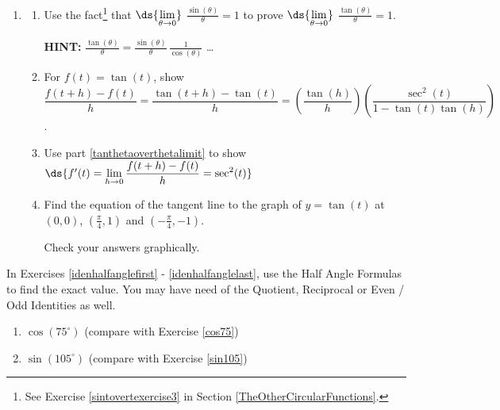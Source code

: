 \documentclass{ximera}
\begin{document}
\begin{enumerate}
\setcounter{enumi}{\value{HW}}

\item\label{derivativetangent}   \begin{enumerate}  \item\label{tanthetaoverthetalimit}  Use the fact\footnote{See Exercise \ref{sintovertexercise3} in Section \ref{TheOtherCircularFunctions}.} that $\ds{\lim_{\theta \rightarrow 0}}$ $\frac{\sin(\theta)}{\theta} = 1$  to prove $\ds{\lim_{\theta \rightarrow 0}}$ $\frac{\tan(\theta)}{\theta} = 1$.

\smallskip

\textbf{HINT:}  $\frac{\tan(\theta)}{\theta} = \frac{\sin(\theta)}{\theta} \, \frac{1}{\cos(\theta)}$ \ldots

\smallskip

 \item For $f(t) = \tan(t)$, show $\dfrac{f(t+h) - f(t)}{h} = \dfrac{\tan(t + h) - \tan(t)}{h} = \left( \dfrac{\tan(h)}{h} \right) \left(\dfrac{\sec^{2}(t)}{1 - \tan(t)\tan(h)} \right)$.

\smallskip

\item Use part \ref{tanthetaoverthetalimit} to show $\ds{f'(t) = \lim_{h \rightarrow 0} \dfrac{f(t+h) - f(t)}{h} = \sec^{2}(t)}$


\item  Find the equation of the tangent line to the graph of $y = \tan(t)$ at $(0,0)$, $\left(\frac{\pi}{4}, 1 \right)$ and $\left(-\frac{\pi}{4}, -1\right)$.  

\smallskip

Check your answers graphically.

\end{enumerate}

\setcounter{HW}{\value{enumi}}
\end{enumerate}


In Exercises \ref{idenhalfanglefirst} - \ref{idenhalfanglelast}, use the Half Angle Formulas to find the exact value.  You may have need of the Quotient, Reciprocal or Even / Odd Identities as well.

\begin{multicols}{2}

\begin{enumerate}

\setcounter{enumi}{\value{HW}}

\item  $\cos(75^{\circ})$  (compare with Exercise \ref{cos75}) \label{idenhalfanglefirst}
\item  $\sin(105^{\circ})$  (compare with Exercise \ref{sin105})

\setcounter{HW}{\value{enumi}}

\end{enumerate}

\end{multicols}
\end{document}
